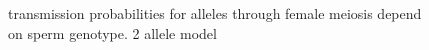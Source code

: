\documentclass[12pt,letterpaper]{article}
\begin{document}
\begin{figure}
\caption{transmission probabilities for alleles through female
  meiosis depend on sperm genotype. 2 allele model}  
\label{Eggsperm_2_allele_cartoon}
\end{figure}


\end{document}
